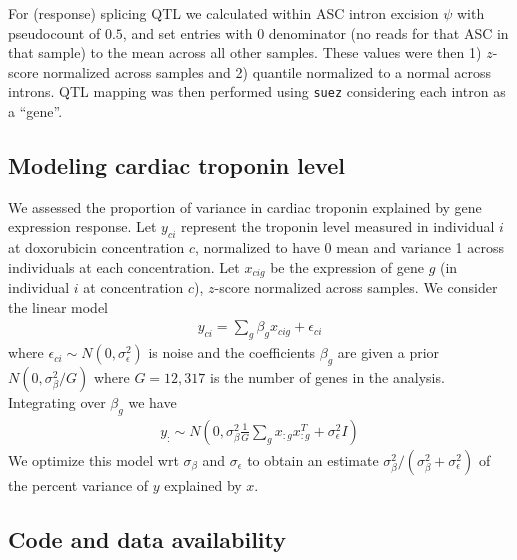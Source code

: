 \documentclass{article}
\begin{document}
For (response) splicing QTL we calculated within ASC intron excision $\psi$ with pseudocount of $0.5$, and set entries with $0$ denominator (no reads for that ASC in that sample) to the mean across all other samples. These values were then 1) $z$-score normalized across samples and 2) quantile normalized to a normal across introns. QTL mapping was then performed using \texttt{suez} considering each intron as a ``gene''. 

\subsection*{Modeling cardiac troponin level}

We assessed the proportion of variance in cardiac troponin explained by gene expression response. Let $y_{ci}$ represent the troponin level measured in individual $i$ at doxorubicin concentration $c$, normalized to have 0 mean and variance 1 across individuals at each concentration. Let $x_{cig}$ be the expression of gene $g$ (in individual $i$ at concentration $c$), $z$-score normalized across samples. We consider the linear model 
\begin{align}
y_{ci} = \sum_g \beta_g x_{cig} + \epsilon_{ci}
\end{align}
where $\epsilon_{ci} \sim N(0,\sigma_\epsilon^2)$ is noise and the coefficients $\beta_g$ are given a prior $N(0, \sigma_\beta^2 / G )$ where $G=12,317$ is the number of genes in the analysis. Integrating over $\beta_g$ we have 
\begin{align}
y_{:} \sim N\left(0 , \sigma_\beta^2 \frac{1}{G} \sum_g x_{:g} x_{:g}^T + \sigma_\epsilon^2 I \right)
\end{align}
We optimize this model wrt $\sigma_\beta$ and $\sigma_\epsilon$ to obtain an estimate $\sigma_\beta^2 / (\sigma_\beta^2 + \sigma_\epsilon^2)$ of the percent variance of $y$ explained by $x$. 

\subsection*{Code and data availability}
\end{document}
